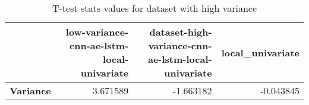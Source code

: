 \begin{table}[h]
\centering
\caption{T-test stats values for dataset with high variance}
\label{table:ttest-stats-variance}
\begin{tabular}{lrrr}
\toprule
{} &  low-variance-cnn-ae-lstm-local-univariate &  dataset-high-variance-cnn-ae-lstm-local-univariate &  local\_univariate \\
\midrule
\textbf{Variance} &                                   3.671589 &                                          -1.663182 &         -0.043845 \\
\bottomrule
\end{tabular}
\end{table}
